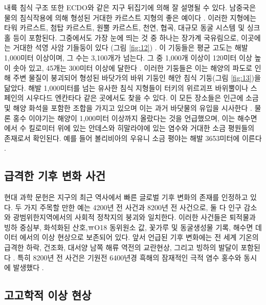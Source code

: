 \documentclass[10pt,twocolumn,letterpaper]{article}
\begin{document}
내륙 침식 구조 또한 ECDO와 같은 지구 뒤집기에 의해 잘 설명될 수 있다. 남중국은 물의 침식작용에 의해 형성된 거대한 카르스트 지형의 좋은 예이다 \cite{82}. 이러한 지형에는 타워 카르스트, 첨탑 카르스트, 원뿔 카르스트, 천연, 협곡, 대규모 동굴 시스템 및 싱크홀 등이 포함된다. 그중에서도 가장 눈에 띄는 것 중 하나는 장가계 국유림으로, 이곳에는 거대한 석영 사암 기들둥이 있다 (그림 \ref{fig:12}) \cite{84}. 이 기둥들은 평균 고도는 해발 1,000미터 이상이며, 그 수는 3,100개가 넘는다. 그 중 1,000개 이상이 120미터 이상 높이 솟아 있고, 45개는 300미터 이상에 달한다 \cite{85}. 이러한 기둥들은 이는 해양의 파도로 인해 주변 물질이 붕괴되어 형성된 바닷가의 바위 기둥인 해안 침식 기둥(그림 \ref{fig:13})을 닮았다. 해발 1,000미터를 넘는 유사한 침식 지형들이 터키의 위르괴프 바위뿔이나 스페인의 시우다드 엔칸타다 같은 곳에서도 찾을 수 있다. 이 모든 장소들은 인근에 소금 및 해양 화석을 포함한 조합을 가지고 있으며 이는 과거 바닷물의 유입을 시사한다 \cite{15,86,87}. 물론 홍수 이야기는 \cite{3} 해양이 1,000미터 이상까지 올랐다는 것을 언급했으며, 이는 해수면에서 수 킬로미터 위에 있는 안데스와 히말라야에 있는 염수와 거대한 소금 평원들의 존재로서 확인된다. 예를 들어 볼리비아의 우유니 소금 평야는 해발 3653미터에 이른다 \cite{94}.

\subsection{급격한 기후 변화 사건}

현대 과학 문헌은 지구의 최근 역사에서 빠른 글로벌 기후 변화의 존재를 인정하고 있다. 두 가지 주목할 만한 예는 4200년 전 사건과 8200년 전 사건으로, 둘 다 인구 감소와 광범위한지역에서의 사회적 정착지의 붕괴와 일치한다. 이러한 사건들은 퇴적물과 빙하 중심부, 화석화된 산호,ㅠO18 동위원소 값, 꽃가루 및 동굴생성물 기록, 해수면 데이터 에서의 이상 현상으로 보존되어 있다. 앞서 언급된 기후 변화에는 전 세계 기온의 급격한 하락, 건조화, 대서양 남쪽 해류 역전의 교란현상, 그리고 빙하의 발달이 포함된다 \cite{90,91,92}. 특히 8200년 전 사건은 기원전 6400년경 흑해의 잠재적인 극적 염수 홍수와 동시에 발생했다 \cite{93}.

\subsection{고고학적 이상 현상}
\end{document}
